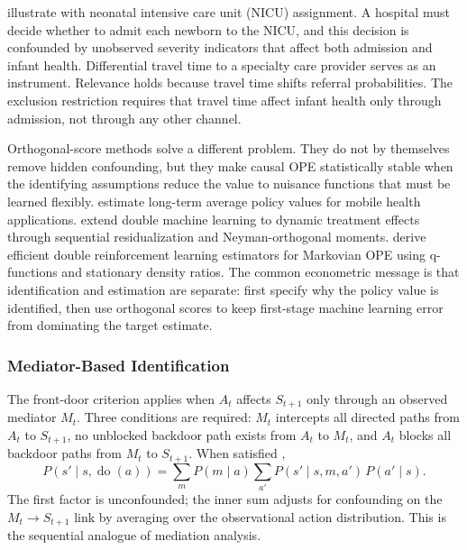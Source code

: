 \citet{liao2024_iv_rl} illustrate with neonatal intensive care unit (NICU) assignment. A hospital must decide whether to admit each newborn to the NICU, and this decision is confounded by unobserved severity indicators that affect both admission and infant health. Differential travel time to a specialty care provider serves as an instrument. Relevance holds because travel time shifts referral probabilities. The exclusion restriction requires that travel time affect infant health only through admission, not through any other channel.

Orthogonal-score methods solve a different problem. They do not by themselves remove hidden confounding, but they make causal OPE statistically stable when the identifying assumptions reduce the value to nuisance functions that must be learned flexibly. \citet{liaoMurphy2021longterm} estimate long-term average policy values for mobile health applications. \citet{lewisSyrgkanis2021dynamicDML} extend double machine learning to dynamic treatment effects through sequential residualization and Neyman-orthogonal moments. \citet{kallusUehara2022doubleRL} derive efficient double reinforcement learning estimators for Markovian OPE using q-functions and stationary density ratios. The common econometric message is that identification and estimation are separate: first specify why the policy value is identified, then use orthogonal scores to keep first-stage machine learning error from dominating the target estimate.

\subsubsection{Mediator-Based Identification}
\label{subsubsec:mediator_identification}

The front-door criterion applies when $A_t$ affects $S_{t+1}$ only through an observed mediator $M_t$. Three conditions are required: $M_t$ intercepts all directed paths from $A_t$ to $S_{t+1}$, no unblocked backdoor path exists from $A_t$ to $M_t$, and $A_t$ blocks all backdoor paths from $M_t$ to $S_{t+1}$. When satisfied \citep{pearl2009causality},
\begin{equation}
P(s' \mid s, \operatorname{do}(a)) = \sum_{m} P(m \mid a) \sum_{a'} P(s' \mid s, m, a') \, P(a' \mid s).
\label{eq:frontdoor}
\end{equation}
The first factor is unconfounded; the inner sum adjusts for confounding on the $M_t \to S_{t+1}$ link by averaging over the observational action distribution. This is the sequential analogue of mediation analysis.


